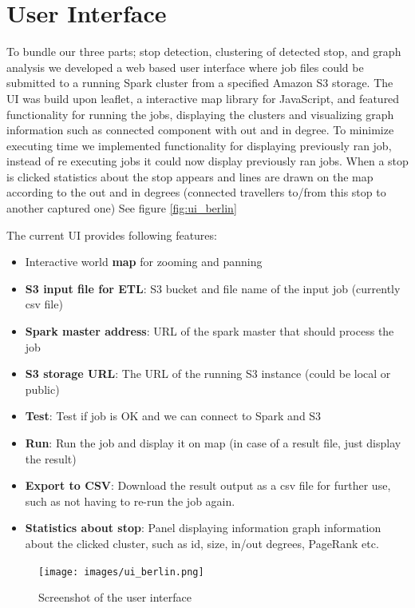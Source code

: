 \section{User Interface}
To bundle our three parts; stop detection, clustering of detected stop, and graph analysis we developed a web based user interface where job files could be submitted to a running Spark cluster from a specified Amazon S3 storage. The UI was build upon leaflet\cite{leaflet}, a interactive map library for JavaScript, and featured functionality for running the jobs, displaying  the clusters and visualizing graph information such as connected component with out and in degree. To minimize executing time we implemented functionality for displaying previously ran job, instead of re executing jobs it could now display previously ran jobs. When a stop is clicked statistics about the stop appears and lines are drawn on the map according to the out and in degrees (connected travellers to/from this stop to another captured one) See figure \autoref{fig:ui_berlin}

The current UI provides following features:
\begin{itemize}
  \item Interactive world \textbf{map} for zooming and panning
  \item \textbf{S3 input file for ETL}: S3 bucket and file name of the input job (currently csv file)  
  \item \textbf{Spark master address}: URL of the spark master that should process the job
  \item \textbf{S3 storage URL}: The URL of the running S3 instance (could be local or public)
  \item \textbf{Test}: Test if job is OK and we can connect to Spark and S3
  \item \textbf{Run}: Run the job and display it on map (in case of a result file, just display the result)
  \item \textbf{Export to CSV}: Download the result output as a csv file for further use, such as not having to re-run the job again. 
  \item \textbf{Statistics about stop}: Panel displaying information  graph information about the clicked cluster, such as id, size, in/out degrees, PageRank etc. 
\end{itemize}

\begin{figure}[!ht]
	\centering
	\texttt{[image: images/ui\_berlin.png]}\\
	\caption{ Screenshot of the user interface }
	\label{fig:ui_berlin}
\end{figure}
\FloatBarrier
